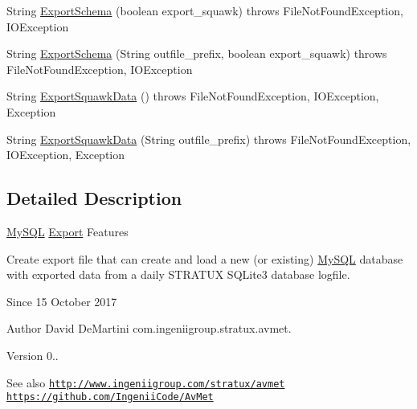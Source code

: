 \begin{DoxyCompactItemize}
\item 
String \hyperlink{classcom_1_1ingeniigroup_1_1stratux_1_1_export_1_1_file_1_1_my_s_q_l_a8940dfc5b0407392d08819ed66512541}{Export\+Schema} (boolean export\+\_\+squawk)  throws File\+Not\+Found\+Exception, I\+O\+Exception 
\item 
String \hyperlink{classcom_1_1ingeniigroup_1_1stratux_1_1_export_1_1_file_1_1_my_s_q_l_a7c0b16d8389041b12ee8bde94013e4f5}{Export\+Schema} (String outfile\+\_\+prefix, boolean export\+\_\+squawk)  throws File\+Not\+Found\+Exception, I\+O\+Exception 
\item 
String \hyperlink{classcom_1_1ingeniigroup_1_1stratux_1_1_export_1_1_file_1_1_my_s_q_l_a7f8f9a06f28b45853a234bf9dc20ea32}{Export\+Squawk\+Data} ()  throws File\+Not\+Found\+Exception, I\+O\+Exception, Exception 
\item 
String \hyperlink{classcom_1_1ingeniigroup_1_1stratux_1_1_export_1_1_file_1_1_my_s_q_l_a9f988f5e57616c8c6adc6ab4fd231c68}{Export\+Squawk\+Data} (String outfile\+\_\+prefix)  throws File\+Not\+Found\+Exception, I\+O\+Exception, Exception 
\end{DoxyCompactItemize}


\subsection{Detailed Description}
\hyperlink{classcom_1_1ingeniigroup_1_1stratux_1_1_export_1_1_file_1_1_my_s_q_l}{My\+S\+QL} \hyperlink{namespacecom_1_1ingeniigroup_1_1stratux_1_1_export}{Export} Features

Create export file that can create and load a new (or existing) \hyperlink{classcom_1_1ingeniigroup_1_1stratux_1_1_export_1_1_file_1_1_my_s_q_l}{My\+S\+QL} database with exported data from a daily S\+T\+R\+A\+T\+UX S\+Q\+Lite3 database logfile.

\begin{DoxySince}{Since}
15 October 2017 
\end{DoxySince}
\begin{DoxyAuthor}{Author}
David De\+Martini  com.\+ingeniigroup.\+stratux.\+avmet. 
\end{DoxyAuthor}
\begin{DoxyVersion}{Version}
0.. 
\end{DoxyVersion}
\begin{DoxySeeAlso}{See also}
\href{http://www.ingeniigroup.com/stratux/avmet}{\tt http\+://www.\+ingeniigroup.\+com/stratux/avmet}  \href{https://github.com/IngeniiCode/AvMet}{\tt https\+://github.\+com/\+Ingenii\+Code/\+Av\+Met} 
\end{DoxySeeAlso}


